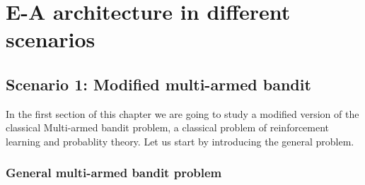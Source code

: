 \documentclass[11pt,a4paper,twoside]{report}
\newcommand{\+}{\textnormal{+} }
\theoremstyle{definition}
\numberwithin{equation}{chapter}
\begin{document}
\chapter{E-A architecture in different scenarios} 
\label{Scenarios}
\section{Scenario 1: Modified multi-armed bandit}
In the first section of this chapter we are going to study a modified version of
the classical Multi-armed bandit problem, a classical problem of reinforcement
learning and probablity theory. Let us start by introducing the general problem.
\subsection{General multi-armed bandit problem}
\end{document}

